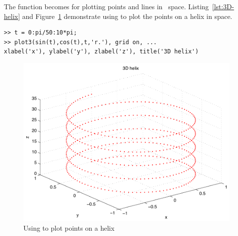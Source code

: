 The \twod {} function becomes  for plotting points and lines in \threed\ space. Listing~\ref{lst:3D-helix} and Figure~\ref{fig:3D-helix} demonstrate using  to plot the points on a helix in \threed space.
\begin{lstlisting}[caption={Using \mcode{plot3} to plot points on a helix},label=lst:3D-helix]
>> t = 0:pi/50:10*pi;
>> plot3(sin(t),cos(t),t,'r.'), grid on, ...
xlabel('x'), ylabel('y'), zlabel('z'), title('3D helix')
\end{lstlisting}
\begin{figure}
	\myfloatalign
	\includegraphics[width=\linewidth]{Graphics/Unit02/3D-helix}
	\caption{Using  to plot points on a helix}
	\label{fig:3D-helix}
\end{figure}

